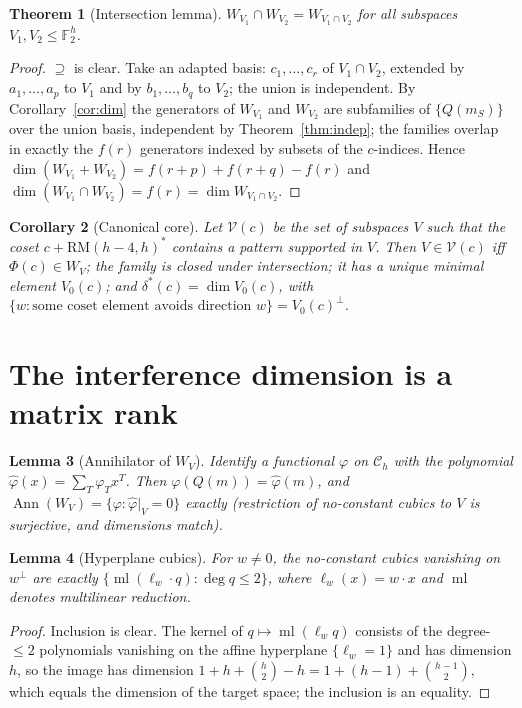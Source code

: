 \documentclass[11pt]{article}
\newtheorem{theorem}{Theorem}
\newtheorem{lemma}[theorem]{Lemma}
\newtheorem{corollary}[theorem]{Corollary}
\theoremstyle{definition}
\theoremstyle{remark}
\newcommand{\F}{\mathbb{F}_2}
\newcommand{\RM}{\mathrm{RM}}
\newcommand{\ml}{\operatorname{ml}}
\newcommand{\Ann}{\operatorname{Ann}}
\newcommand{\ds}{\delta^{*}}
\newcommand{\Ch}{\mathcal{C}_h}
\begin{document}
\begin{theorem}[Intersection lemma]\label{thm:intersect}
$W_{V_1}\cap W_{V_2}=W_{V_1\cap V_2}$ for all subspaces $V_1,V_2\le\F^h$.
\end{theorem}
\begin{proof}
$\supseteq$ is clear. Take an adapted basis: $c_1,\dots,c_r$ of $V_1\cap V_2$, extended by $a_1,\dots,a_p$ to
$V_1$ and by $b_1,\dots,b_q$ to $V_2$; the union is independent. By Corollary~\ref{cor:dim} the generators of $W_{V_1}$
and $W_{V_2}$ are subfamilies of $\{Q(m_S)\}$ over the union basis, independent by Theorem~\ref{thm:indep}; the
families overlap in exactly the $f(r)$ generators indexed by subsets of the $c$-indices. Hence
$\dim(W_{V_1}+W_{V_2})=f(r+p)+f(r+q)-f(r)$ and $\dim(W_{V_1}\cap W_{V_2})=f(r)=\dim W_{V_1\cap V_2}$.
\end{proof}

\begin{corollary}[Canonical core]\label{cor:core}
Let $\mathcal V(c)$ be the set of subspaces $V$ such that the coset $c+\RM(h-4,h)^{*}$ contains a
pattern supported in $V$. Then
$V\in\mathcal V(c)$ iff $\Phi(c)\in W_V$; the family is closed under intersection; it has a unique minimal
element $V_0(c)$; and $\ds(c)=\dim V_0(c)$, with
$\{w:\text{some coset element avoids direction }w\}=V_0(c)^{\perp}$.
\end{corollary}

\section{The interference dimension is a matrix rank}\label{sec:alg}

\begin{lemma}[Annihilator of $W_V$]\label{lem:ann}
Identify a functional $\varphi$ on $\Ch$ with the polynomial $\hat\varphi(x)=
\sum_T\varphi_Tx^T$. Then $\varphi(Q(m))=\hat\varphi(m)$, and $\Ann(W_V)=\{\varphi:\hat\varphi|_V=0\}$ exactly (restriction of
no-constant cubics to $V$ is surjective, and dimensions match).
\end{lemma}

\begin{lemma}[Hyperplane cubics]\label{lem:hyper}
For $w\ne0$, the no-constant cubics vanishing on $w^{\perp}$ are
exactly $\{\ml(\ell_w\cdot q):\deg q\le2\}$, where $\ell_w(x)=w\cdot x$ and $\ml$ denotes multilinear reduction.
\end{lemma}
\begin{proof}
Inclusion is clear. The kernel of $q\mapsto\ml(\ell_wq)$ consists of the degree-$\le2$ polynomials
vanishing on the affine hyperplane $\{\ell_w=1\}$ and has dimension $h$, so the image has dimension
$1+h+\binom h2-h=1+(h-1)+\binom{h-1}2$, which equals the dimension of the target space; the
inclusion is an equality.
\end{proof}
\end{document}

